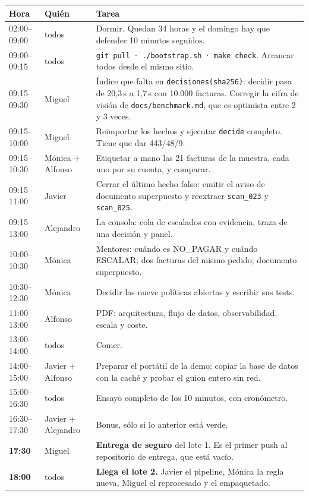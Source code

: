 \documentclass[11pt,a4paper]{article}
\newcommand{\cmd}[1]{\texttt{\small #1}}
\begin{document}
\begin{center}
\begin{tabularx}{\linewidth}{llX}
\toprule
\textbf{Hora} & \textbf{Quién} & \textbf{Tarea} \\
\midrule
02:00--09:00 & todos & Dormir. Quedan 34 horas y el domingo hay que defender 10 minutos seguidos. \\
09:00--09:15 & todos & \cmd{git pull} · \cmd{./bootstrap.sh} · \cmd{make check}. Arrancar todos desde el mismo sitio. \\
09:15--09:30 & Miguel & Índice que falta en \cmd{decisiones(sha256)}: decidir pasa de 20,3\,s a 1,7\,s con 10.000 facturas. Corregir la cifra de visión de \cmd{docs/benchmark.md}, que es optimista entre 2 y 3 veces. \\
09:15--10:00 & Miguel & Reimportar los hechos y ejecutar \cmd{decide} completo. Tiene que dar 443/48/9. \\
09:15--10:30 & Mónica + Alfonso & Etiquetar a mano las 21 facturas de la muestra, cada uno por su cuenta, y comparar. \\
09:15--11:00 & Javier & Cerrar el último hecho falso: emitir el aviso de documento superpuesto y reextraer \cmd{scan\_023} y \cmd{scan\_025}. \\
09:15--13:00 & Alejandro & La consola: cola de escalados con evidencia, traza de una decisión y panel. \\
10:00--10:30 & Mónica & Mentores: cuándo es NO\_PAGAR y cuándo ESCALAR; dos facturas del mismo pedido; documento superpuesto. \\
10:30--12:30 & Mónica & Decidir las nueve políticas abiertas y escribir sus tests. \\
11:00--13:00 & Alfonso & PDF: arquitectura, flujo de datos, observabilidad, escala y coste. \\
13:00--14:00 & todos & Comer. \\
14:00--15:00 & Javier + Alfonso & Preparar el portátil de la demo: copiar la base de datos con la caché y probar el guion entero sin red. \\
15:00--16:30 & todos & Ensayo completo de los 10 minutos, con cronómetro. \\
16:30--17:30 & Javier + Alejandro & Bonus, sólo si lo anterior está verde. \\
\textbf{17:30} & Miguel & \textbf{Entrega de seguro} del lote 1. Es el primer push al repositorio de entrega, que está vacío. \\
\textbf{18:00} & todos & \textbf{Llega el lote 2.} Javier el pipeline, Mónica la regla nueva, Miguel el reprocesado y el empaquetado. \\

\end{tabularx}
\end{center}
\end{document}
